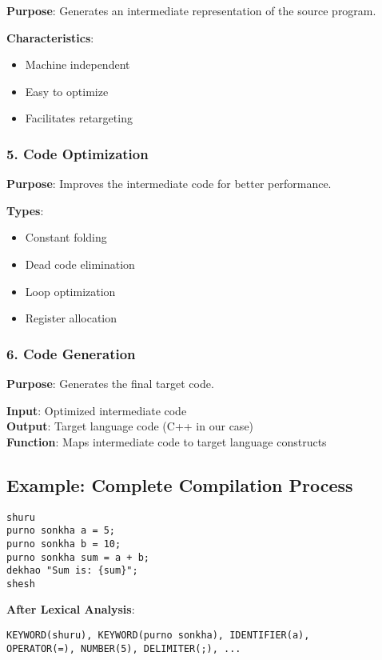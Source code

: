 \documentclass[12pt,a4paper]{article}
\begin{document}
\textbf{Purpose}: Generates an intermediate representation of the source program.

\textbf{Characteristics}:
\begin{itemize}
    \item Machine independent
    \item Easy to optimize
    \item Facilitates retargeting
\end{itemize}

\subsubsection{5. Code Optimization}

\textbf{Purpose}: Improves the intermediate code for better performance.

\textbf{Types}:
\begin{itemize}
    \item Constant folding
    \item Dead code elimination
    \item Loop optimization
    \item Register allocation
\end{itemize}

\subsubsection{6. Code Generation}

\textbf{Purpose}: Generates the final target code.

\textbf{Input}: Optimized intermediate code\\
\textbf{Output}: Target language code (C++ in our case)\\
\textbf{Function}: Maps intermediate code to target language constructs

\subsection{Example: Complete Compilation Process}

\begin{lstlisting}[caption=Banglish Source Code]
shuru
purno sonkha a = 5;
purno sonkha b = 10;
purno sonkha sum = a + b;
dekhao "Sum is: {sum}";
shesh
\end{lstlisting}

\textbf{After Lexical Analysis}:
\begin{verbatim}
KEYWORD(shuru), KEYWORD(purno sonkha), IDENTIFIER(a), 
OPERATOR(=), NUMBER(5), DELIMITER(;), ...
\end{verbatim}
\end{document}
